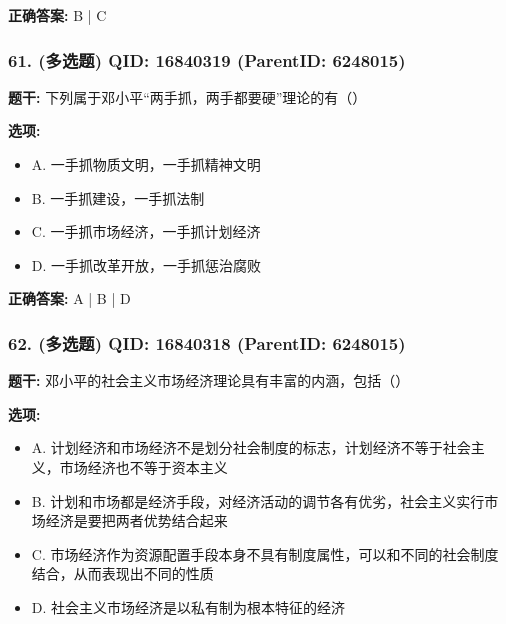 \documentclass[12pt,UTF8]{ctexart}
\begin{document}
\textbf{正确答案:}
B | C

\vspace{0.3em}\hrulefill\vspace{0.7em}

\subsubsection*{61. (多选题) \small QID: 16840319 (ParentID: 6248015)}

\textbf{题干:}
下列属于邓小平“两手抓，两手都要硬”理论的有（）



\textbf{选项:}
\begin{itemize}[leftmargin=*]

  \item A. 一手抓物质文明，一手抓精神文明

  \item B. 一手抓建设，一手抓法制

  \item C. 一手抓市场经济，一手抓计划经济

  \item D. 一手抓改革开放，一手抓惩治腐败

\end{itemize}

\textbf{正确答案:}
A | B | D

\vspace{0.3em}\hrulefill\vspace{0.7em}

\subsubsection*{62. (多选题) \small QID: 16840318 (ParentID: 6248015)}

\textbf{题干:}
邓小平的社会主义市场经济理论具有丰富的内涵，包括（）



\textbf{选项:}
\begin{itemize}[leftmargin=*]

  \item A. 计划经济和市场经济不是划分社会制度的标志，计划经济不等于社会主义，市场经济也不等于资本主义

  \item B. 计划和市场都是经济手段，对经济活动的调节各有优劣，社会主义实行市场经济是要把两者优势结合起来

  \item C. 市场经济作为资源配置手段本身不具有制度属性，可以和不同的社会制度结合，从而表现出不同的性质

  \item D. 社会主义市场经济是以私有制为根本特征的经济

\end{itemize}
\end{document}
